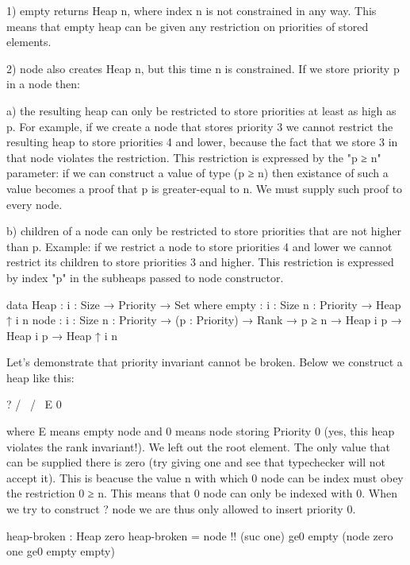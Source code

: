  1) empty returns Heap n, where index n is not constrained in any
    way. This means that empty heap can be given any restriction on
    priorities of stored elements.

 2) node also creates Heap n, but this time n is constrained. If we
    store priority p in a node then:

      a) the resulting heap can only be restricted to store
         priorities at least as high as p. For example, if we
         create a node that stores priority 3 we cannot restrict
         the resulting heap to store priorities 4 and lower,
         because the fact that we store 3 in that node violates the
         restriction. This restriction is expressed by the "p ≥ n"
         parameter: if we can construct a value of type (p ≥ n)
         then existance of such a value becomes a proof that p is
         greater-equal to n. We must supply such proof to every
         node.

      b) children of a node can only be restricted to store
         priorities that are not higher than p. Example: if we
         restrict a node to store priorities 4 and lower we cannot
         restrict its children to store priorities 3 and
         higher. This restriction is expressed by index "p" in the
         subheaps passed to node constructor.

\begin{code}
data Heap : {i : Size} → Priority → Set where
  empty : {i : Size} {n : Priority} → Heap {↑ i} n
  node  : {i : Size} {n : Priority} → (p : Priority) → Rank → p ≥ n →
          Heap {i} p → Heap {i} p → Heap {↑ i} n
\end{code}

Let's demonstrate that priority invariant cannot be broken. Below
we construct a heap like this:
\begin{code}
     ?
    / \
   /   \
  E     0
\end{code}

where E means empty node and 0 means node storing Priority 0 (yes,
this heap violates the rank invariant!). We left out the root
element. The only value that can be supplied there is zero (try
giving one and see that typechecker will not accept it). This is
beacuse the value n with which 0 node can be index must obey the
restriction 0 ≥ n. This means that 0 node can only be indexed with
0. When we try to construct ? node we are thus only allowed to
insert priority 0.

\begin{code}
heap-broken : Heap zero
heap-broken = node {!!} (suc one) ge0 empty (node zero one ge0 empty empty)
\end{code}


